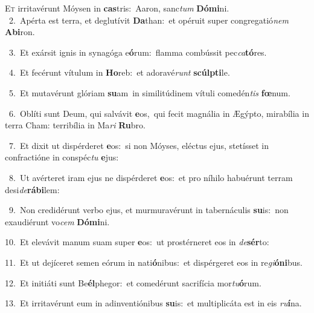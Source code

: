 \lettrine{\initial\textcolor{\initialcolor}{E}}{t} irritavérunt Móysen in \textbf{cas}\-tris:~\star Aaron, sanc\textit{tum} \textbf{Dó}\-\textbf{mi}ni.\\
{\numbfont\textcolor{\numbcolor}{~2.}}~Apérta est terra, et deglutívit \textbf{Da}\-than:~\star et opéruit super congregatió\textit{nem} \textbf{Ab}\-\textbf{i}ron.\par
{\numbfont\textcolor{\numbcolor}{~3.}}~Et exársit ignis in synagóga e\-\textbf{ó}\-rum:~\star flamma combússit pec\-\textit{ca}\-\textbf{tó}res.\par
{\numbfont\textcolor{\numbcolor}{~4.}}~Et fecérunt vítulum in \textbf{Ho}\-reb:~\star et adoravé\textit{runt} \textbf{scúlp}\-\textbf{ti}le.\par
{\numbfont\textcolor{\numbcolor}{~5.}}~Et mutavérunt glóriam \textbf{su}\-am~\star in similitúdinem vítuli comedén\textit{tis} \textbf{fœ}\-num.\par
{\numbfont\textcolor{\numbcolor}{~6.}}~Oblíti sunt Deum, qui salvávit \textbf{e}\-os,~\star qui fecit magnália in Ægýpto, mirabília in terra Cham: terribília in Ma\textit{ri} \textbf{Ru}\-bro.\par
{\numbfont\textcolor{\numbcolor}{~7.}}~Et dixit ut dispérderet \textbf{e}\-os:~\star si non Móyses, eléctus ejus, stetísset in confractióne in conspéc\textit{tu} \textbf{e}\-jus:\par
{\numbfont\textcolor{\numbcolor}{~8.}}~Ut avérteret iram ejus ne dispérderet \textbf{e}\-os:~\star et pro níhilo habuérunt terram desi\-\textit{de}\-\textbf{rá}\textbf{bi}lem:\par
{\numbfont\textcolor{\numbcolor}{~9.}}~Non credidérunt verbo ejus, et murmuravérunt in tabernáculis \textbf{su}\-is:~\star non exaudiérunt vo\textit{cem} \textbf{Dó}\-\textbf{mi}ni.\par
{\numbfont\textcolor{\numbcolor}{10.}}~Et elevávit manum suam super \textbf{e}\-os:~\star ut prostérneret eos in \textit{de}\-\textbf{sér}to:\par
{\numbfont\textcolor{\numbcolor}{11.}}~Et ut dejíceret semen eórum in nati\-\textbf{ó}\-nibus:~\star et dispérgeret eos in re\-\textit{gi}\-\textbf{ó}\textbf{ni}bus.\par
{\numbfont\textcolor{\numbcolor}{12.}}~Et initiáti sunt Be\-\textbf{él}\-phegor:~\star et comedérunt sacrifícia mor\-\textit{tu}\-\textbf{ó}rum.\par
{\numbfont\textcolor{\numbcolor}{13.}}~Et irritavérunt eum in adinventiónibus \textbf{su}\-is:~\star et multiplicáta est in eis \textit{ru}\-\textbf{í}na.\par
